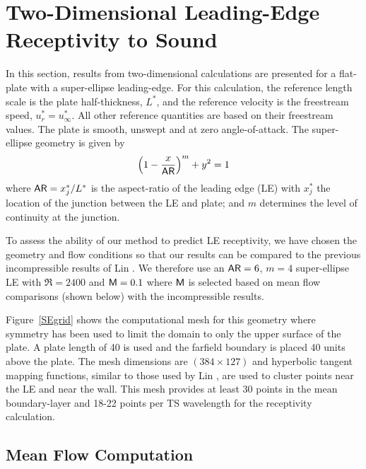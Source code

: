\section[Two-Dimensional Leading-Edge Receptivity to Sound]{Two-Dimensional 
Leading-Edge \protect \\ Receptivity to Sound\label{c:2dle} }

In this section, results from two-dimensional calculations are presented for a
flat-plate with a super-ellipse leading-edge.  For this calculation, the
reference length scale is the plate half-thickness, $L^*$, and the reference
velocity is the freestream speed, $u_r^* = u^*_\infty$.  All other reference
quantities are based on their freestream values.  The plate is smooth, unswept
and at zero angle-of-attack.  The super-ellipse geometry is given by
%
\begin{equation}
  \left(1-{{x}\over{{\sf AR}}}\right)^m + y^2 = 1
\end{equation}
%
where ${\sf AR}=x^*_j / L^*$ is the aspect-ratio of the leading edge (LE) with
$x^*_j$ the location of the junction between the LE and plate; and $m$
determines the level of continuity at the junction.

To assess the ability of our method to predict LE receptivity, we have chosen
the geometry and flow conditions so that our results can be compared to the
previous incompressible results of Lin \cite{Lin:92}.  We therefore use an
${\sf AR}=6$, $m=4$ super-ellipse LE with $\Re=2400$ and ${\sf M}=0.1$ where ${\sf M}$ is
selected based on mean flow comparisons (shown below) with the incompressible
results.
%
%

Figure~\ref{SEgrid} shows the computational mesh for this geometry where
symmetry has been used to limit the domain to only the upper surface of the
plate.  A plate length of 40 is used and the farfield boundary is placed 40
units above the plate.  The mesh dimensions are $(384 \times 127)$ and
hyperbolic tangent mapping functions, similar to those used by Lin
\cite{Lin:92}, are used to cluster points near the LE and near the wall.  This
mesh provides at least 30 points in the mean boundary-layer and 18-22 points
per TS wavelength for the receptivity calculation.

\subsection{Mean Flow Computation\label{s:2dmean}}

